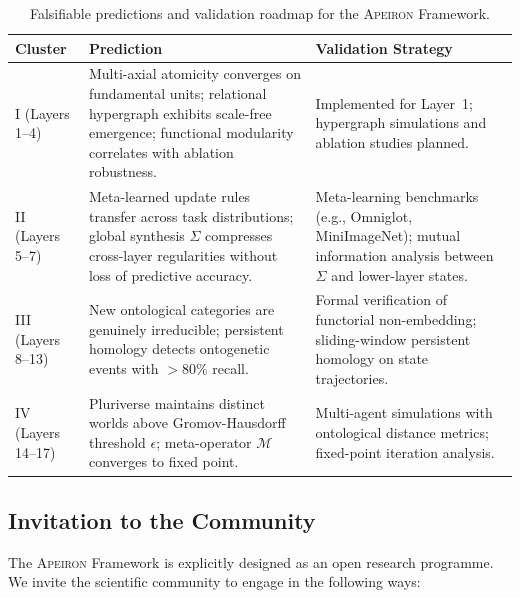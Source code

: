 \begin{table}[htbp]
\centering
\caption{Falsifiable predictions and validation roadmap for the \textsc{Apeiron} Framework.}
\label{tab:roadmap}
\begin{tabular}{p{} p{} p{}}
\toprule
\textbf{Cluster} & \textbf{Prediction} & \textbf{Validation Strategy} \\
\midrule
I (Layers 1--4) & Multi-axial atomicity converges on fundamental units; relational hypergraph exhibits scale-free emergence; functional modularity correlates with ablation robustness. & Implemented for Layer~1; hypergraph simulations and ablation studies planned. \\
II (Layers 5--7) & Meta-learned update rules transfer across task distributions; global synthesis $\Sigma$ compresses cross-layer regularities without loss of predictive accuracy. & Meta-learning benchmarks (e.g., Omniglot, MiniImageNet); mutual information analysis between $\Sigma$ and lower-layer states. \\
III (Layers 8--13) & New ontological categories are genuinely irreducible; persistent homology detects ontogenetic events with $>80\%$ recall. & Formal verification of functorial non-embedding; sliding-window persistent homology on state trajectories. \\
IV (Layers 14--17) & Pluriverse maintains distinct worlds above Gromov-Hausdorff threshold $\epsilon$; meta-operator $\mathcal{M}$ converges to fixed point. & Multi-agent simulations with ontological distance metrics; fixed-point iteration analysis. \\
\bottomrule
\end{tabular}
\end{table}

\subsection{Invitation to the Community}

The \textsc{Apeiron} Framework is explicitly designed as an open research programme. We invite the scientific community to engage in the following ways:

